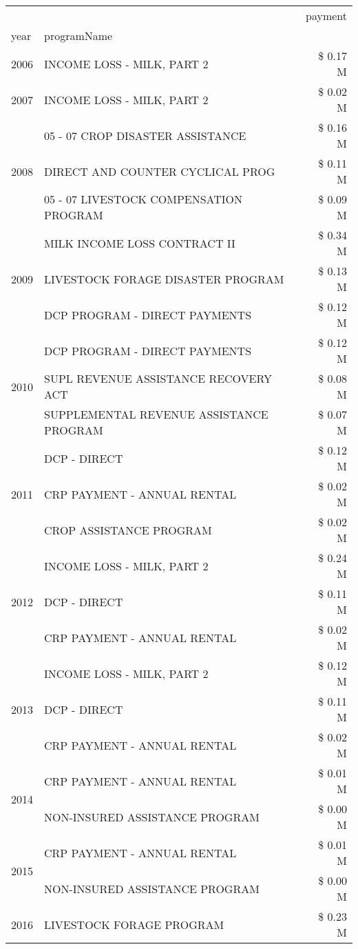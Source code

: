\begin{tabular}{llr}
\toprule
 &  & payment \\
year & programName &  \\
\midrule
2006 & INCOME LOSS - MILK, PART 2 & \$ 0.17 M \\
\cline{1-3}
2007 & INCOME LOSS - MILK, PART 2 & \$ 0.02 M \\
\cline{1-3}
\multirow[t]{3}{*}{2008} & 05 - 07 CROP DISASTER ASSISTANCE & \$ 0.16 M \\
 & DIRECT AND COUNTER CYCLICAL PROG & \$ 0.11 M \\
 & 05 - 07 LIVESTOCK COMPENSATION PROGRAM & \$ 0.09 M \\
\cline{1-3}
\multirow[t]{3}{*}{2009} & MILK INCOME LOSS CONTRACT II & \$ 0.34 M \\
 & LIVESTOCK FORAGE DISASTER  PROGRAM & \$ 0.13 M \\
 & DCP PROGRAM - DIRECT PAYMENTS & \$ 0.12 M \\
\cline{1-3}
\multirow[t]{3}{*}{2010} & DCP PROGRAM - DIRECT PAYMENTS & \$ 0.12 M \\
 & SUPL REVENUE ASSISTANCE RECOVERY ACT & \$ 0.08 M \\
 & SUPPLEMENTAL REVENUE ASSISTANCE PROGRAM & \$ 0.07 M \\
\cline{1-3}
\multirow[t]{3}{*}{2011} & DCP - DIRECT & \$ 0.12 M \\
 & CRP PAYMENT - ANNUAL RENTAL & \$ 0.02 M \\
 & CROP ASSISTANCE PROGRAM & \$ 0.02 M \\
\cline{1-3}
\multirow[t]{3}{*}{2012} & INCOME LOSS - MILK, PART 2 & \$ 0.24 M \\
 & DCP - DIRECT & \$ 0.11 M \\
 & CRP PAYMENT - ANNUAL RENTAL & \$ 0.02 M \\
\cline{1-3}
\multirow[t]{3}{*}{2013} & INCOME LOSS - MILK, PART 2 & \$ 0.12 M \\
 & DCP - DIRECT & \$ 0.11 M \\
 & CRP PAYMENT - ANNUAL RENTAL & \$ 0.02 M \\
\cline{1-3}
\multirow[t]{2}{*}{2014} & CRP PAYMENT - ANNUAL RENTAL & \$ 0.01 M \\
 & NON-INSURED ASSISTANCE PROGRAM & \$ 0.00 M \\
\cline{1-3}
\multirow[t]{2}{*}{2015} & CRP PAYMENT - ANNUAL RENTAL & \$ 0.01 M \\
 & NON-INSURED ASSISTANCE PROGRAM & \$ 0.00 M \\
\cline{1-3}
\multirow[t]{3}{*}{2016} & LIVESTOCK FORAGE PROGRAM & \$ 0.23 M \\

\end{tabular}
